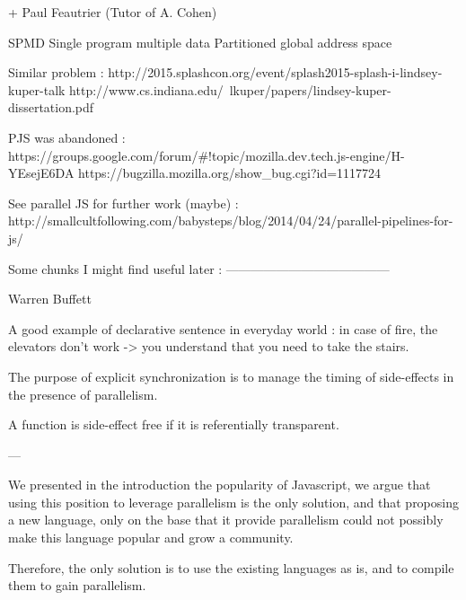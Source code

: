 + Paul Feautrier (Tutor of A. Cohen)


SPMD Single program multiple data
Partitioned global address space


Similar problem :
http://2015.splashcon.org/event/splash2015-splash-i-lindsey-kuper-talk
http://www.cs.indiana.edu/~lkuper/papers/lindsey-kuper-dissertation.pdf

PJS was abandoned :
https://groups.google.com/forum/#!topic/mozilla.dev.tech.js-engine/H-YEsejE6DA
https://bugzilla.mozilla.org/show_bug.cgi?id=1117724

See parallel JS for further work (maybe) :
http://smallcultfollowing.com/babysteps/blog/2014/04/24/parallel-pipelines-for-js/

Some chunks I might find useful later :
---------------------------------------

{Warren Buffett}

A good example of declarative sentence in everyday world : in case of fire, 
the elevators don't work -> you understand that you need to take the stairs.

The purpose of explicit synchronization is to manage the timing of side-effects in the presence of parallelism. 

A function is side-effect free if it is referentially transparent.



---


We presented in the introduction the popularity of Javascript, we argue that using this position to leverage parallelism is the only solution, and that proposing a new language, only on the base that it provide parallelism could not possibly make this language popular and grow a community.

Therefore, the only solution is to use the existing languages as is, and to compile them to gain parallelism.